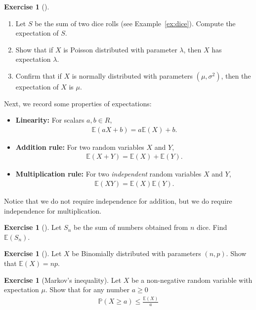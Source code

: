 \documentclass[11pt]{article}
\theoremstyle{definition}
\newtheorem{exercise}[]{Exercise}
\renewcommand{\P}{\mathbb{P}}
\newcommand{\E}{\mathbb{E}}
\begin{document}
\begin{exercise}[]
  $\;$\vspace{-1em}

  \begin{enumerate}[label = (\alph*)]
    \item Let $S$ be the sum of two dice rolls (see Example~\ref{ex:dice}). Compute
    the expectation of $S$.
    \item Show that if $X$ is Poisson distributed with parameter $\lambda$, then
    $X$ has expectation $\lambda$.
    \item Confirm that if $X$ is normally distributed with parameters $(\mu, \sigma^2)$,
    then the expectation of $X$ is $\mu$.
  \end{enumerate}
\end{exercise}

Next, we record some properties of expectations:
\begin{itemize}
  \item {\bf Linearity: } For scalars $a, b\in R$,
  \begin{align*}
    \E(aX + b) = a\E(X) + b.
  \end{align*}
  \item {\bf Addition rule: } For two random variables $X$ and $Y$,
  \begin{align*}
    \E(X + Y) = \E(X) + \E(Y).
  \end{align*}
  \item {\bf Multiplication rule: } For two \textit{independent}
  random variables $X$ and $Y$,
  \begin{align*}
    \E(XY) = \E(X)\E(Y).
  \end{align*}
\end{itemize}
Notice that we do not require independence for addition, but we do require
independence for multiplication.

\begin{exercise}[]
  Let $S_n$ be the sum of numbers obtained from $n$ dice. Find $\E(S_n)$.
\end{exercise}

\begin{exercise}[]
  Let $X$ be Binomially distributed with parameters $(n, p)$.
  Show that $\E(X) = np$.
\end{exercise}

\begin{exercise}[Markov's inequality]
  Let $X$ be a non-negative random variable with expectation $\mu$.
  Show that for any number $a \geq 0$
  \begin{align}
    \P(X \geq a) \leq \frac{\E(X)}{a}
    \label{eq:markov}
  \end{align}
\end{exercise}
\end{document}
